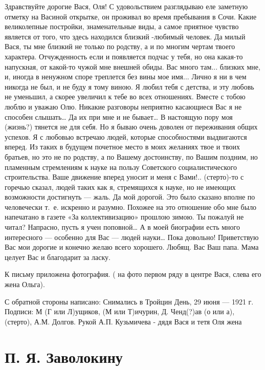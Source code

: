 \documentclass[]{memoir}
\begin{document}
Здравствуйте дорогие Вася, Оля!
С удовольствием разглядываю еле заметную отметку на  Васиной открытке, он проживал во время пребывания в Сочи. Какие великолепные постройки, знаменательные виды, а самое приятное чувство является от того, что здесь находился близкий -любимый человек. Да милый Вася, ты мне близкий не только по родству, а и по многим чертам твоего характера. Отчужденность если и появляется подчас у тебя, но она какая-то напускная, от какой-то чужой  мне внешней обиды. Вас много там... близких мне, и, иногда в ненужном споре треплется без вины мое имя... Лично я ни в чем никогда не был, и не буду я тому виною. Я любил тебя с детства, и эту любовь не уменьшил, а скорее увеличил к тебе во всех отношениях. Вместе с тобою люблю и уважаю Олю. Никакие разговоры неприятно касающиеся Вас я не способен слышать… Да их при мне и не бывает…
В настоящую пору моя (жизнь?) тянется не для себя. Но я бываю очень доволен от переживания общих успехов. Я с любовью встречаю людей, которые способностями выдвигаются вперед. Из таких в будущем почетное место в моих желаниях твое и твоих братьев, но это не по родству, а по Вашему достоинству, по Вашим поздним, но пламенным стремлениям к науке на пользу Советского социалистического строительства. 
Ваше движение вперед уносит и меня с Вами!..
(стерто)-то с горечью сказал, людей таких как я, стремящихся к науке, но не имеющих возможности достигнуть — жаль. Да мой дорогой. Это было сказано вполне по человечески т. е. искренно и разумно. Похожее на это отношение обо мне было напечатано в газете «За коллективизацию» прошлою зимою. Ты пожалуй не читал? Напрасно, пусть я учен поповной… А в моей биографии есть много интересного — особенно для Вас — людей науки… Пока довольно! Приветствую Вас мои дорогие и конечно желаю всего хорошего.
Любящ. Вас Ваш папа.
Мама целует Вас и благодарит за ласку.

К письму приложена фотография. ( на фото первом ряду в центре Вася, слева его жена Ольга).  

С обратной стороны написано:
Снимались в Тройцин День, 29 июня — 1921 г.
Подписи: М (Г или Л)ущиков, (М или Т)ичурин, Д. Ченд(?)ав (о или а),  (стерто), А.М. Долгов. 
Рукой А.П. Кузьмичева -  дядя Вася и тетя Оля жена 







\section{П. Я. Заволокину}
\end{document}
